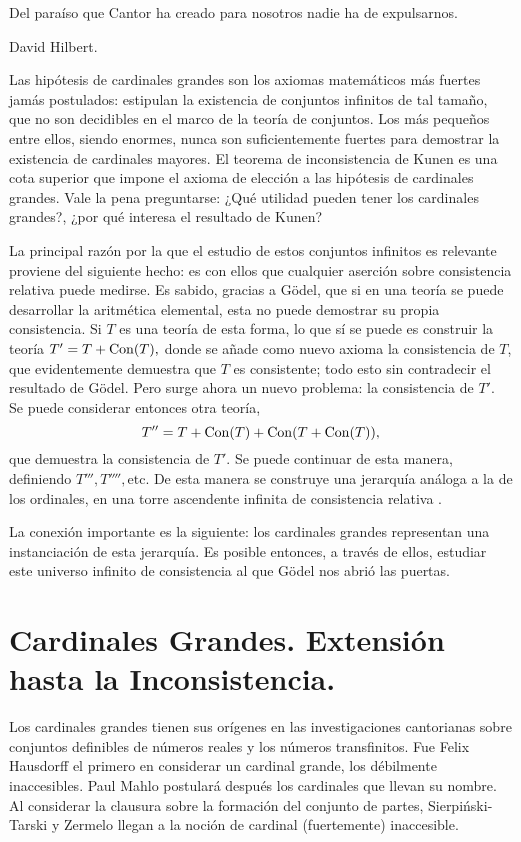 \epigraph
{
Del paraíso que Cantor ha creado para nosotros nadie ha de expulsarnos.
}
{David Hilbert. \autocite[170]{hilbert_uber_1926}}

Las hipótesis de cardinales grandes son los axiomas matemáticos
más fuertes jamás postulados: estipulan la existencia de conjuntos
infinitos de tal tamaño, que no son decidibles en el marco de la teoría de conjuntos.
Los más pequeños entre ellos, siendo enormes, nunca son suficientemente
fuertes para demostrar la existencia de cardinales mayores.
El teorema de inconsistencia de Kunen es
una cota superior que impone el axioma de elección a las
hipótesis de cardinales grandes.
Vale la pena preguntarse: ¿Qué utilidad pueden tener los cardinales grandes?,
¿por qué interesa el resultado de Kunen?

La principal razón por la que el estudio de estos conjuntos infinitos
es relevante proviene del siguiente hecho:
es con ellos que cualquier aserción sobre consistencia relativa
puede medirse.
Es sabido, gracias a Gödel, que si en una teoría se puede desarrollar la aritmética
elemental, esta no puede demostrar su propia consistencia.
Si $T$ es una teoría de esta forma, lo que sí se puede es construir la teoría
$T'=T+\operatorname{Con} ( T ),$
donde se añade como nuevo axioma la consistencia
de $T$,
que evidentemente demuestra que $T$ es consistente; todo esto sin contradecir
el resultado de Gödel. Pero surge ahora un nuevo problema: la consistencia
de $T'$.
Se puede considerar entonces otra teoría,
\[T'' = T + \operatorname{Con} ( T ) + \operatorname{Con} ( T + \operatorname{Con} ( T ) ),\]
que demuestra la consistencia de $T'$.
Se puede continuar de esta manera, definiendo $T''', T'''',\text{etc}$.
De esta manera se construye una jerarquía análoga a la de los ordinales,
en una torre ascendente infinita de consistencia relativa
\autocite[\S 7.7, \S 8.9]{hamkins_lectures_2020}.

La conexión importante es la siguiente:
los cardinales grandes representan una instanciación de esta jerarquía.
Es posible entonces, a través de ellos, estudiar este universo infinito de
consistencia al que Gödel nos abrió las puertas.

\section*{Cardinales Grandes. Extensión hasta la Inconsistencia.}

Los cardinales grandes tienen sus orígenes en las investigaciones cantorianas
sobre conjuntos definibles de números reales y los números transfinitos.
Fue Felix Hausdorff \autocite{hausdorff_grundzuge_nodate}
el primero en considerar un cardinal grande,
los débilmente inaccesibles.
Paul Mahlo \autocite{mahlo_uber_1911,mahlo_zur_1912,mahlo_zur_1913}
postulará después los cardinales que llevan su nombre.
Al considerar la clausura sobre la formación del conjunto de partes,
Sierpiński-Tarski \autocite{sierpinski_sur_1930} y  Zermelo \autocite{zermelo_uber_1930}
llegan a la noción de cardinal (fuertemente) inaccesible.

